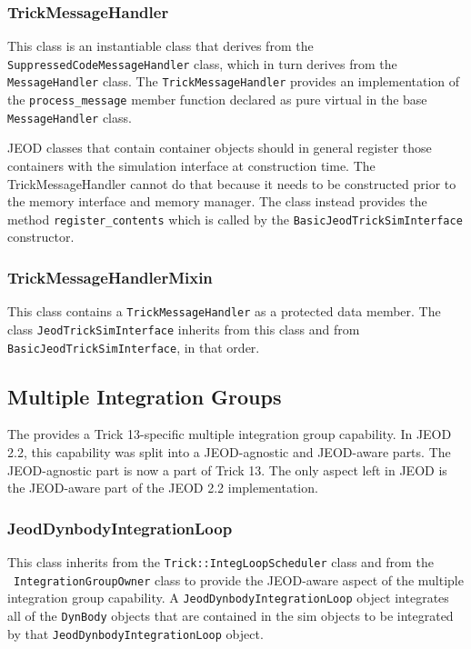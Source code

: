 \subsubsection{TrickMessageHandler}
This class is an instantiable class that derives from the
\verb|SuppressedCodeMessageHandler| class, which in turn derives from
the \verb|MessageHandler| class.
The \verb|TrickMessageHandler| provides an implementation of the
\verb|process_message| member function declared as pure virtual in the base
\verb|MessageHandler| class.

JEOD classes that contain container objects should in general register those
containers with the simulation interface at construction time.
The TrickMessageHandler cannot do that because it needs to be constructed
prior to the memory interface and memory manager.
The class instead provides the method \verb|register_contents| which is
called by the \verb|BasicJeodTrickSimInterface| constructor.

\subsubsection{TrickMessageHandlerMixin}
This class contains a \verb|TrickMessageHandler| as a protected data member.
The class \verb|JeodTrickSimInterface| inherits from this class and from
\verb|BasicJeodTrickSimInterface|, in that order. 


\subsection{Multiple Integration Groups}
The \ModelDesc provides a Trick 13-specific multiple integration group
capability. In JEOD 2.2, this capability was split into a JEOD-agnostic and
JEOD-aware parts. The JEOD-agnostic part is now a part of Trick 13. The
only aspect left in JEOD is the JEOD-aware part of the JEOD 2.2 implementation.

\subsubsection{JeodDynbodyIntegrationLoop}
This class inherits from the \verb|Trick::IntegLoopScheduler| class
and from the \INTEGRATION\ \verb|IntegrationGroupOwner| class to
 provide the JEOD-aware aspect of the multiple integration group
capability.
A \verb|JeodDynbodyIntegrationLoop| object integrates all of the
\verb|DynBody| objects that are contained in the sim objects to be integrated
by that \verb|JeodDynbodyIntegrationLoop| object.

